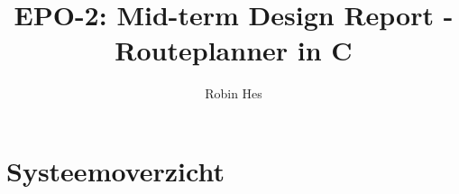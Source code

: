 \documentclass{report}
\title{EPO-2: Mid-term Design Report - Routeplanner in C}
\author{Robin Hes}
\begin{document}
\chapter{Systeemoverzicht}
\end{document}
